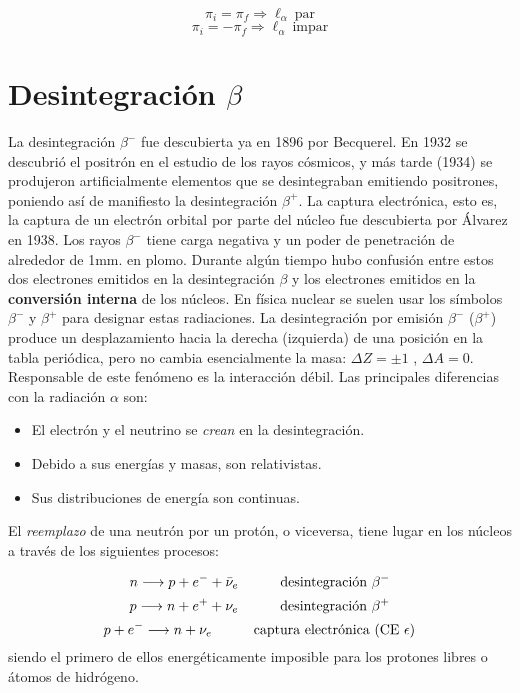 \begin{equation}
    \pi_i = \pi_f \Longrightarrow \ell_\alpha \ \text{par}
\end{equation}
\begin{equation*}
    \pi_i = - \pi_f \Longrightarrow \ell_\alpha \ \text{impar}
\end{equation*}



\section{Desintegración $\beta$}

La desintegración $\beta^-$ fue descubierta ya en 1896 por Becquerel. En 1932 se descubrió el positrón en el estudio de los rayos cósmicos, y más tarde (1934) se produjeron artificialmente elementos que se desintegraban emitiendo positrones, poniendo así de manifiesto la desintegración $\beta^+$. La captura electrónica, esto es, la captura de un electrón orbital por parte del núcleo fue descubierta por Álvarez en 1938. Los rayos $\beta^-$ tiene carga negativa y un poder de penetración de alrededor de 1mm. en plomo. Durante algún tiempo hubo confusión entre estos dos electrones emitidos en la desintegración $\beta$ y los electrones emitidos en la \textbf{conversión interna} de los núcleos. En física nuclear se suelen usar los símbolos $\beta^-$ y $\beta^+$ para designar estas radiaciones. La desintegración por emisión $\beta^-$ ($\beta^+$) produce un desplazamiento hacia la derecha (izquierda) de una posición en la tabla periódica, pero no cambia esencialmente la masa: $\Delta Z= \pm 1$ , $\Delta A = 0$. Responsable de este fenómeno es la interacción débil. Las principales diferencias con la radiación $\alpha$ son:

\begin{itemize}
	\item El electrón y el neutrino se \textit{crean} en la desintegración.
	\item Debido a sus energías y masas, son relativistas.
	\item Sus distribuciones de energía son continuas.
\end{itemize}	

El \textit{reemplazo} de una neutrón por un protón, o viceversa, tiene lugar en los núcleos a través de los siguientes procesos:

\begin{equation}
	n \longrightarrow p + e^- + \bar{\nu}_e  \quad \quad \quad \text{desintegración} \ \beta^-
\end{equation}
\begin{equation}
	p \longrightarrow n + e^+ + {\nu}_e \quad \quad \quad \text{desintegración} \ \beta^+
\end{equation}
\begin{equation}
	p + e^- \longrightarrow n + {\nu}_e \quad \quad \quad \text{captura electrónica (CE} \ \epsilon)
\end{equation}
siendo el primero de ellos energéticamente imposible para los protones libres o átomos de hidrógeno. 

